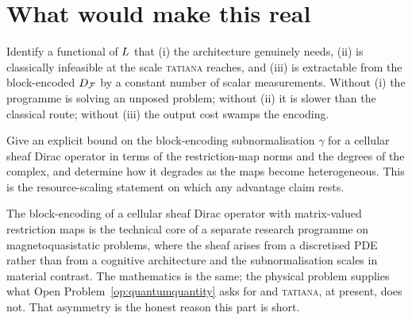\section{What would make this real}

\begin{openproblem}\label{op:quantumquantity}
Identify a functional of $L$ that (i) the architecture genuinely
needs, (ii) is classically infeasible at the scale \textsc{tatiana}
reaches, and (iii) is extractable from the block-encoded $D_{\mathcal{F}}$ by a
constant number of scalar measurements. Without (i) the programme is
solving an unposed problem; without (ii) it is slower than the classical
route; without (iii) the output cost swamps the encoding.
\end{openproblem}

\begin{openproblem}
Give an explicit bound on the block-encoding subnormalisation $\gamma$
for a cellular sheaf Dirac operator in terms of the restriction-map
norms and the degrees of the complex, and determine how it degrades as
the maps become heterogeneous. This is the resource-scaling statement on
which any advantage claim rests.
\end{openproblem}

\begin{remark}
The block-encoding of a cellular sheaf Dirac operator with matrix-valued
restriction maps is the technical core of a separate research programme
on magnetoquasistatic problems, where the sheaf arises from a
discretised PDE rather than from a cognitive architecture and the
subnormalisation scales in material contrast. The mathematics is the
same; the physical problem supplies what
Open Problem~\ref{op:quantumquantity} asks for and \textsc{tatiana},
at present, does not. That asymmetry is the honest reason this part is
short.
\end{remark}
